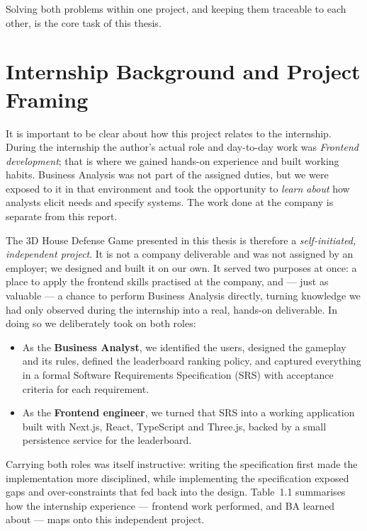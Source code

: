 Solving both problems within one project, and keeping them traceable to each
other, is the core task of this thesis.

\section{Internship Background and Project Framing}

It is important to be clear about how this project relates to the internship.
During the internship the author's actual role and day-to-day work was
\emph{Frontend development}; that is where we gained hands-on experience and
built working habits. Business Analysis was not part of the assigned duties, but
we were exposed to it in that environment and took the opportunity to
\emph{learn about} how analysts elicit needs and specify systems. The work done
at the company is separate from this report.

The 3D House Defense Game presented in this thesis is therefore a
\emph{self-initiated, independent project}. It is not a company deliverable and
was not assigned by an employer; we designed and built it on our own. It served
two purposes at once: a place to apply the frontend skills practised at the
company, and --- just as valuable --- a chance to perform Business Analysis
directly, turning knowledge we had only observed during the internship into a
real, hands-on deliverable. In doing so we deliberately took on both roles:

\begin{itemize}
  \item As the \textbf{Business Analyst}, we identified the users, designed the
        gameplay and its rules, defined the leaderboard ranking policy, and
        captured everything in a formal Software Requirements Specification
        (SRS) with acceptance criteria for each requirement.
  \item As the \textbf{Frontend engineer}, we turned that SRS into a working
        application built with Next.js, React, TypeScript and Three.js, backed
        by a small persistence service for the leaderboard.
\end{itemize}

Carrying both roles was itself instructive: writing the specification first
made the implementation more disciplined, while implementing the specification
exposed gaps and over-constraints that fed back into the design. Table~1.1
summarises how the internship experience --- frontend work performed, and BA
learned about --- maps onto this independent project.

